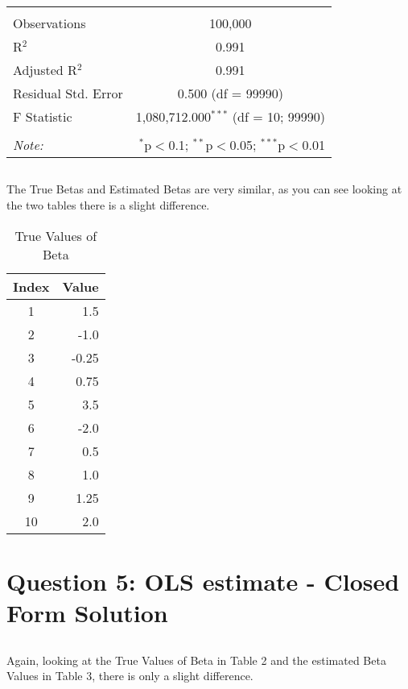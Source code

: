 \documentclass{article}
\begin{document}
\begin{table}[!htbp]
\begin{tabular}{@{\extracolsep{5pt}}lc}
  & \\ 
\hline \\[-1.8ex] 
Observations & 100,000 \\ 
R$^{2}$ & 0.991 \\ 
Adjusted R$^{2}$ & 0.991 \\ 
Residual Std. Error & 0.500 (df = 99990) \\ 
F Statistic & 1,080,712.000$^{***}$ (df = 10; 99990) \\ 
\hline 
\hline \\[-1.8ex] 
\textit{Note:}  & \multicolumn{1}{r}{$^{*}$p$<$0.1; $^{**}$p$<$0.05; $^{***}$p$<$0.01} \\ 
\end{tabular} 
\end{table} 
\subsection{}
The True Betas and Estimated Betas are very similar, as you can see looking at the two tables there is a slight difference. 
\begin{table}[htbp]
\centering
\caption{True Values of Beta}
\begin{tabular}{cr}
\hline
Index & Value \\
\hline
1 & 1.5 \\
2 & -1.0 \\
3 & -0.25 \\
4 & 0.75 \\
5 & 3.5 \\
6 & -2.0 \\
7 & 0.5 \\
8 & 1.0 \\
9 & 1.25 \\
10 & 2.0 \\
\hline
\end{tabular}
\end{table}    
\section{Question 5: OLS estimate - Closed Form Solution}

\subsection{}

Again, looking at the True Values of Beta in Table 2 and the estimated Beta Values in Table 3, there is only a slight difference.
\end{document}
